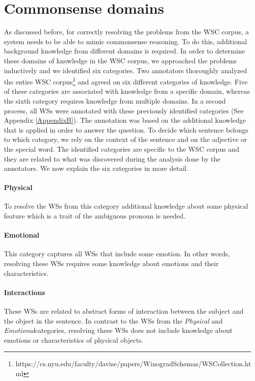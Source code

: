 \section{Commonsense domains}
As discussed before, for correctly resolving the problems from the WSC corpus, a system needs to be able to mimic commonsense reasoning. To do this, additional background knowledge from different domains is required. In order to determine these domains of knowledge in the WSC corpus, we approached the problems inductively and we identified six categories. Two annotators thoroughly analyzed the entire WSC corpus\footnote{https://cs.nyu.edu/faculty/davise/papers/WinogradSchemas/WSCollection.html} and agreed on six different categories of knowledge. Five of these categories are associated with knowledge from a specific domain, whereas the sixth category requires knowledge from multiple domains.
In a second process, all WSs were annotated with these previously identified categories (See Appendix \ref{AppendixB}). The annotation was based on the additional knowledge that is applied in order to answer the question. To decide which sentence belongs to which category, we rely on the context of the sentence and on the adjective or the special word. The identified categories are specific to the WSC corpus and they are related to what was discovered during the analysis done by the annotators. We now explain the six categories in more detail. 

\paragraph{Physical} To resolve the WSs from this category additional knowledge about some physical feature which is a trait of the ambiguous pronoun is needed.
 
\paragraph{Emotional} This category captures all WSs that include some emotion. In other words, resolving these WSs requires some knowledge about emotions and their characteristics.

\paragraph{Interactions} These WSs are related to abstract forms of interaction between the subject and the object in the sentence. In contrast to the WSs from the \textit{Physical} and \textit{Emotional}categories, resolving these WSs does not include knowledge about emotions or characteristics of physical objects.

